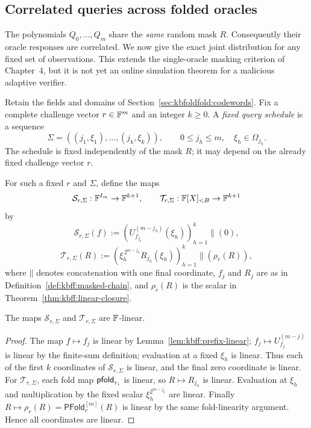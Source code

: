 \subsection{Correlated queries across folded oracles}\label{sec:kbfoldfold:joint}

The polynomials $Q_0,\ldots,Q_m$ share the \emph{same} random mask $R$. Consequently their oracle responses are correlated. We now give the exact joint distribution for any fixed set of observations. This extends the single-oracle masking criterion of Chapter~4, but it is not yet an online simulation theorem for a malicious adaptive verifier.

\begin{definition}\label{def:kbff:schedule}
Retain the fields and domains of Section~\ref{sec:kbfoldfold:codewords}.
Fix a complete challenge vector $r\in\mathbb{F}^m$ and an integer $k\geq0$.
A \emph{fixed query schedule} is a sequence
\[
 \Sigma=((j_1,\xi_1),\ldots,(j_k,\xi_k)),\qquad
 0\leq j_h\leq m,\quad \xi_h\in\Omega_{j_h}.
\]
The schedule is fixed independently of the mask $R$; it may depend on
the already fixed challenge vector $r$.
\end{definition}

\begin{definition}\label{def:kbff:observation-maps}
For such a fixed $r$ and $\Sigma$, define the maps
\[
 \mathcal S_{r,\Sigma}:\mathbb{F}^{I_m}\to\mathbb{F}^{k+1},
 \qquad
 \mathcal T_{r,\Sigma}:\mathbb{F}[X]_{<B}\to\mathbb{F}^{k+1}
\]
by
\[
 \mathcal S_{r,\Sigma}(f)
 :=\left(U_{f_{j_h}}^{(m-j_h)}(\xi_h)\right)_{h=1}^k
       \mathbin{\|}(0),
\]
\[
 \mathcal T_{r,\Sigma}(R)
 :=\left(\xi_h^{\,2^{m-j_h}}R_{j_h}(\xi_h)\right)_{h=1}^k
       \mathbin{\|}(\rho_r(R)),
\]
where $\mathbin{\|}$ denotes concatenation with one final coordinate,
$f_j$ and $R_j$ are as in Definition~\ref{def:kbff:masked-chain},
and $\rho_r(R)$ is the scalar in Theorem~\ref{thm:kbff:linear-closure}.
\end{definition}

\begin{lemma}\label{lem:kbff:observation-linear}
The maps $\mathcal S_{r,\Sigma}$ and $\mathcal T_{r,\Sigma}$
are $\mathbb{F}$-linear.
\end{lemma}
\begin{proof}
The map $f\mapsto f_j$ is linear by Lemma~\ref{lem:kbff:prefix-linear};
$f_j\mapsto U_{f_j}^{(m-j)}$ is linear by the finite-sum definition;
evaluation at a fixed $\xi_h$ is linear. Thus each of the first
$k$ coordinates of $\mathcal S_{r,\Sigma}$ is linear, and the final
zero coordinate is linear.
For $\mathcal T_{r,\Sigma}$, each fold map $\mathsf{pfold}_{r_i}$ is linear,
so $R\mapsto R_{j_h}$ is linear. Evaluation at $\xi_h$ and
multiplication by the fixed scalar
$\xi_h^{2^{m-j_h}}$ are linear. Finally
$R\mapsto\rho_r(R)=\mathsf{PFold}^{[m]}_r(R)$ is linear by the same
fold-linearity argument. Hence all coordinates are linear.
\end{proof}

